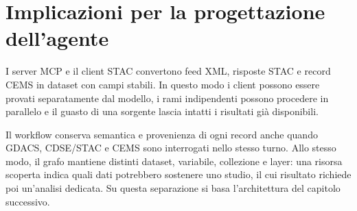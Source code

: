 \section{Implicazioni per la progettazione dell'agente}

I server MCP e il client STAC convertono feed XML, risposte STAC e record CEMS
in dataset con campi stabili. In questo modo i client possono essere provati
separatamente dal modello, i rami indipendenti possono procedere in parallelo e
il guasto di una sorgente lascia intatti i risultati già disponibili.

Il workflow conserva semantica e provenienza di ogni record anche quando GDACS,
CDSE/STAC e CEMS sono interrogati nello stesso turno. Allo stesso modo, il grafo
mantiene distinti dataset, variabile, collezione e layer: una risorsa scoperta
indica quali dati potrebbero sostenere uno studio, il cui risultato richiede poi
un'analisi dedicata. Su questa separazione si basa l'architettura del capitolo
successivo.
